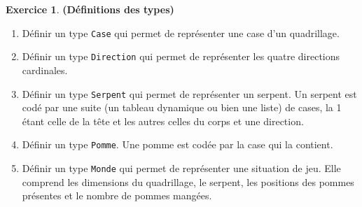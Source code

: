 \documentclass[12pt]{article}
\theoremstyle{definition}
\newtheorem{Exercice}{Exercice}
\begin{document}
\begin{Exercice} {\bf (Définitions des types)}\smallskip
\begin{enumerate}
    \item Définir un type {\tt Case} qui permet de représenter une
    case d'un quadrillage.
    \smallskip

    \item Définir un type {\tt Direction} qui permet de représenter
    les quatre directions cardinales.
    \smallskip

    \item Définir un type {\tt Serpent} qui permet de représenter un
    serpent. Un serpent est codé par une suite (un tableau dynamique ou
    bien une liste) de cases, la 1\iere{} étant celle de la tête et les
    autres celles du corps et une direction.
    \smallskip

    \item Définir un type {\tt Pomme}. Une pomme est codée par la
    case qui la contient.
    \smallskip

    \item Définir un type {\tt Monde} qui permet de représenter une
    situation de jeu. Elle comprend les dimensions du quadrillage, le
    serpent, les positions des pommes présentes et le nombre de pommes
    mangées.
\end{enumerate}
\end{Exercice}
\bigskip
\end{document}
